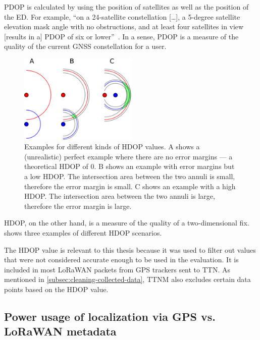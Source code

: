 \ac{PDOP} is calculated by using the position of satellites as well as the position of the \acl{ED}.
For example, ``on a 24-satellite constellation […], a 5-degree satellite elevation mask angle with no obstructions, and at least four satellites in view [results in a] \acf{PDOP} of six or lower''~\cite{langley_dilution_1999}.
In a sense, \ac{PDOP} is a measure of the quality of the current \ac{GNSS} constellation for a user.

\begin{figure}[htbp]
    \centering
    \includegraphics[width=0.5\textwidth]{pictures/multilateration/Geometric_Dilution_Of_Precision.eps}
    \caption{
        Examples for different kinds of \ac{HDOP} values.
        A shows a (unrealistic) perfect example where there are no error margins --- a theoretical \ac{HDOP} of 0.
        B shows an example with error margins but a low \ac{HDOP}.
        The intersection area between the two annuli is small, therefore the error margin is small.
        C shows an example with a high \ac{HDOP}.
        The intersection area between the two annuli is large, therefore the error margin is large.\cite{xoneca_english_2013}
    }\label{pic:hdop-example-diagram}
\end{figure}

\ac{HDOP}, on the other hand, is a measure of the quality of a two-dimensional fix.
 shows three examples of different \ac{HDOP} scenarios.

The \ac{HDOP} value is relevant to this thesis because it was used to filter out values that were not considered accurate enough to be used in the evaluation.
It is included in most \ac{LoRaWAN} packets from \ac{GPS} trackers sent to \ac{TTN}.
As mentioned in \cref{subsec:cleaning-collected-data}, \ac{TTNM} also excludes certain data points based on the \ac{HDOP} value.

\subsection{Power usage of localization via \acl{GPS} vs. \acs{LoRaWAN} metadata}\label{subsec:gnss-power-usage}

